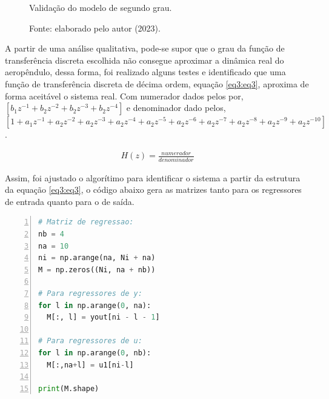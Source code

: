 \begin{figure}[!h]
	\centering
	\caption{Validação do modelo de segundo grau.}
	\caption*{Fonte: elaborado pelo autor (2023).}
	\label{fig3:image_21}
\end{figure}

A partir de uma análise qualitativa, pode-se supor que o grau da função de transferência discreta escolhida não consegue aproximar a dinâmica real do aeropêndulo, dessa forma, foi realizado alguns testes e identificado que uma função de transferência discreta de décima ordem, equação \ref{eq3:eq3}, aproxima de forma aceitável o sistema real.  Com numerador dados pelos por, $[b_1z^{-1}+b_2z^{-2}+b_2z^{-3}+b_2z^{-4}]$ e denominador dado pelos, $[1+a_1z^{-1}+a_2z^{-2}+a_2z^{-3}+a_2z^{-4}+a_2z^{-5}+a_2z^{-6}+a_2z^{-7}+a_2z^{-8}+a_2z^{-9}+a_2z^{-10}]$.


\begin{align}
H(z) = \frac{numerador}{denominador}\label{eq3:eq3}
\end{align}


Assim, foi ajustado o algorítimo para identificar o sistema a partir da estrutura da equação \ref{eq3:eq3}, o código abaixo gera as matrizes tanto para os regressores de entrada quanto para o de saída. 

\vspace{0.5cm}

\begin{lstlisting}[language=python, numbers=left, label=py3, caption={Estruturando os dados para aplicar o método dos mínimos quadrados.}]
# Matriz de regressao:
nb = 4
na = 10
ni = np.arange(na, Ni + na)
M = np.zeros((Ni, na + nb))

# Para regressores de y:
for l in np.arange(0, na):
  M[:, l] = yout[ni - l - 1]

# Para regressores de u:
for l in np.arange(0, nb):
  M[:,na+l] = u1[ni-l]

print(M.shape)
\end{lstlisting}


